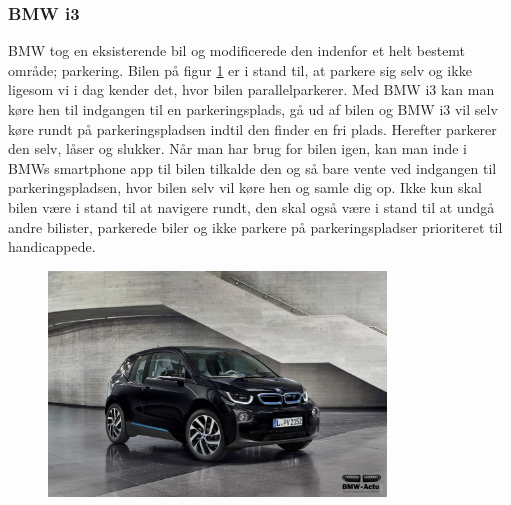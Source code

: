 \subsubsection{BMW i3}
BMW tog en eksisterende bil og modificerede den indenfor et helt bestemt område; parkering. Bilen på figur \ref{fig:BMW_i3} er i stand til, at parkere sig selv og ikke ligesom vi i dag kender det, hvor bilen parallelparkerer. Med BMW i3 kan man køre hen til indgangen til en parkeringsplads, gå ud af bilen og BMW i3 vil selv køre rundt på parkeringspladsen indtil den finder en fri plads. Herefter parkerer den selv, låser og slukker. Når man har brug for bilen igen, kan man inde i BMWs smartphone app til bilen tilkalde den og så bare vente ved indgangen til parkeringspladsen, hvor bilen selv vil køre hen og samle dig op. Ikke kun skal bilen være i stand til at navigere rundt, den skal også være i stand til at undgå andre bilister, parkerede biler og ikke parkere på parkeringspladser prioriteret til handicappede.
\FloatBarrier
\begin{figure}[h!]
	\centering
	\includegraphics[width=0.8\textwidth]{images/bmw-i3-fluid-black-1.jpg}
	\label{fig:BMW_i3}
\end{figure}
\FloatBarrier